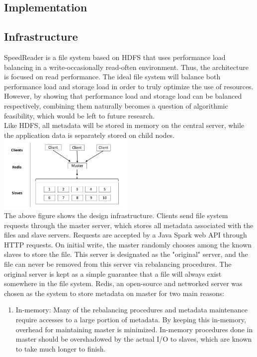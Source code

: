 \documentclass[twoside]{article}
\begin{document}
\begin{multicols}{2}

\section{Implementation}
\subsection*{Infrastructure}
SpeedReader is a file system based on HDFS that uses performance load balancing in a write-occasionally read-often environment. Thus, the architecture is focused on read performance. The ideal file system will balance both performance load and storage load in order to truly optimize the use of resources. However, by showing that performance load and storage load can be balanced respectively, combining them naturally becomes a question of algorithmic feasibility, which would be left to future research.\\\indent
Like HDFS, all metadata will be stored in memory on the central server, while the application data is separately stored on child nodes.
\includegraphics[width=6.5cm]{res/server_diagram.jpg}\\\indent
The above figure shows the design infrastructure. Clients send file system requests through the master server, which stores all metadata associated with the files and slave servers. Requests are accepted by a Java Spark web API through HTTP requests. On initial write, the master randomly chooses among the known slaves to store the file. This server is designated as the "original" server, and the file can never be removed from this server via rebalancing procedures. The original server is kept as a simple guarantee that a file will always exist somewhere in the file system. Redis, an open-source and networked server was chosen as the system to store metadata on master for two main reasons:
\begin{enumerate}
	\item In-memory: Many of the rebalancing procedures and metadata maintenance require accesses to a large portion of metadata. By keeping this in-memory, overhead for maintaining master is minimized. In-memory procedures done in master should be overshadowed by the actual I/O to slaves, which are known to take much longer to finish.

\end{enumerate}
\end{multicols}
\end{document}
